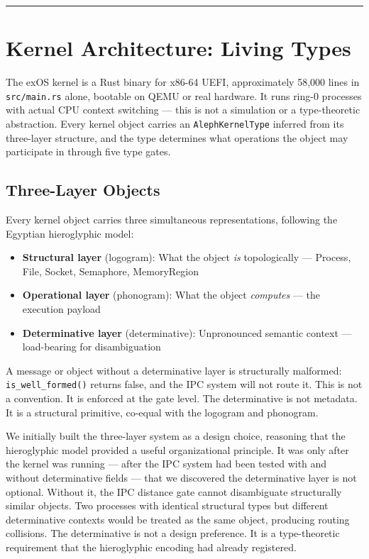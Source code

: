 \documentclass[12pt,a4paper]{article}
\begin{document}
\begin{center}
\rule{0.5\textwidth}{0.4pt}
\end{center}

\section{Kernel Architecture: Living Types}

The exOS kernel is a Rust binary for x86-64 UEFI, approximately 58,000 lines in \texttt{src/main.rs} alone, bootable on QEMU or real hardware. It runs ring-0 processes with actual CPU context switching --- this is not a simulation or a type-theoretic abstraction. Every kernel object carries an \texttt{AlephKernelType} inferred from its three-layer structure, and the type determines what operations the object may participate in through five type gates.

\subsection{Three-Layer Objects}

Every kernel object carries three simultaneous representations, following the Egyptian hieroglyphic model:

\begin{itemize}
    \item \textbf{Structural layer} (logogram): What the object \emph{is} topologically --- Process, File, Socket, Semaphore, MemoryRegion
    \item \textbf{Operational layer} (phonogram): What the object \emph{computes} --- the execution payload
    \item \textbf{Determinative layer} (determinative): Unpronounced semantic context --- load-bearing for disambiguation
\end{itemize}

A message or object without a determinative layer is structurally malformed: \texttt{is\_well\_formed()} returns false, and the IPC system will not route it. This is not a convention. It is enforced at the gate level. The determinative is not metadata. It is a structural primitive, co-equal with the logogram and phonogram.

We initially built the three-layer system as a design choice, reasoning that the hieroglyphic model provided a useful organizational principle. It was only after the kernel was running --- after the IPC system had been tested with and without determinative fields --- that we discovered the determinative layer is not optional. Without it, the IPC distance gate cannot disambiguate structurally similar objects. Two processes with identical structural types but different determinative contexts would be treated as the same object, producing routing collisions. The determinative is not a design preference. It is a type-theoretic requirement that the hieroglyphic encoding had already registered.
\end{document}
